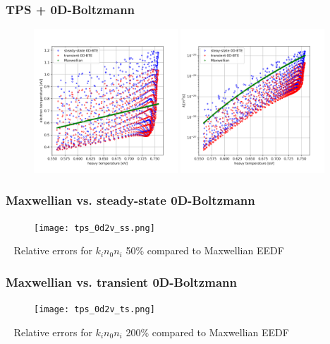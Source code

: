 \documentclass[mathserif, aspectratio=169]{beamer}
\begin{document}
\begin{frame}
	\frametitle{TPS + 0D-Boltzmann}
	\vspace{-0.25in}
	\begin{figure}
		\centering
		\includegraphics[width=0.48\textwidth]{te_vs_tg_tps_bte.png}
		\includegraphics[width=0.48\textwidth]{rates_tps_bte.png}
	\end{figure}
\end{frame}

\begin{frame}
	\frametitle{Maxwellian vs. steady-state 0D-Boltzmann}
	\begin{figure}
		\begin{center}
			\texttt{[image: tps\_0d2v\_ss.png]}
		\end{center}
	\end{figure}
	\textbullet~ Relative errors for $k_i n_0 n_i$ 50\% compared to Maxwellian EEDF
\end{frame}

\begin{frame}
	\frametitle{Maxwellian vs. transient 0D-Boltzmann}
	\begin{figure}
		\begin{center}
			\texttt{[image: tps\_0d2v\_ts.png]}
		\end{center}
	\end{figure}
	\textbullet~ Relative errors for $k_i n_0 n_i$ 200\% compared to Maxwellian EEDF
\end{frame}
\end{document}
